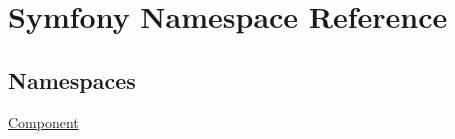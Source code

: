 \hypertarget{namespace_symfony}{}\section{Symfony Namespace Reference}
\label{namespace_symfony}
\subsection*{Namespaces}
\begin{DoxyCompactItemize}
\item 
 \mbox{\hyperlink{namespace_symfony_1_1_component}{Component}}
\end{DoxyCompactItemize}
